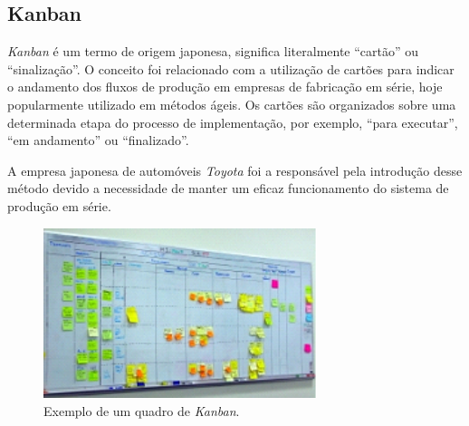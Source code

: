\subsection{Kanban}
\par \emph{Kanban} é um termo de origem japonesa, significa literalmente ``cartão'' ou ``sinalização''. O conceito foi relacionado com a utilização de cartões para indicar o andamento dos fluxos de produção em empresas de fabricação em série, hoje popularmente utilizado em métodos ágeis. Os cartões são organizados sobre uma determinada etapa do processo de implementação, por exemplo, ``para executar'', ``em andamento'' ou ``finalizado''.
\par A empresa japonesa de automóveis \emph{Toyota} foi a responsável pela introdução desse método devido a necessidade de manter um eficaz funcionamento do sistema de produção em série.
\begin{figure}[!htb]
\centering
\includegraphics[width=8cm]{figuras/kanban_exemplo}
\caption{\label{fig:kanban_exemplo}Exemplo de um quadro de \emph{Kanban}.}
\end{figure}

